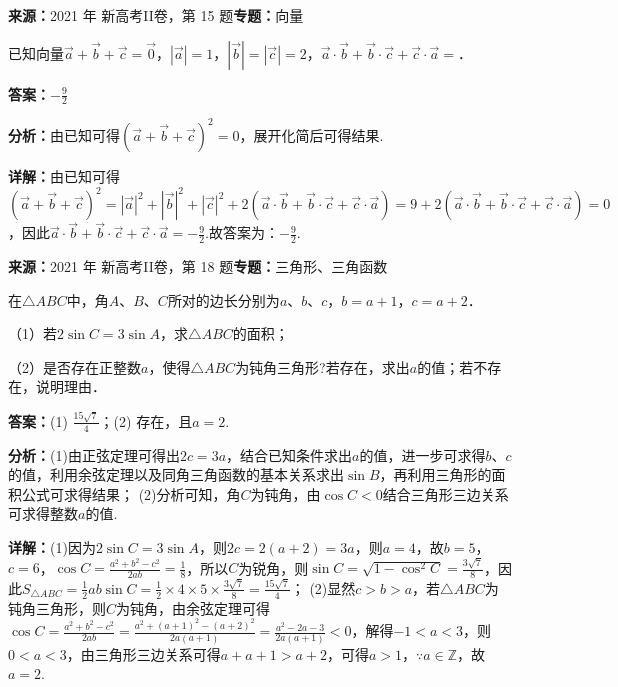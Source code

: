 \begin{question}[points=5]
\textbf{来源：}2021 年 新高考II卷，第 15 题\quad \textbf{专题：}向量\par
已知向量$\vec{a}+\vec{b}+\vec{c}=\vec{0}$，$|\vec{a}|=1$，$|\vec{b}|=|\vec{c}|=2$，$\vec{a}\cdot\vec{b}+\vec{b}\cdot\vec{c}+\vec{c}\cdot\vec{a}=$．
\fillin[{$-\frac{9}{2}$}]
\begin{solution}
\textbf{答案：}$-\frac{9}{2}$

\textbf{分析：}由已知可得$(\vec{a}+\vec{b}+\vec{c})^2=0$，展开化简后可得结果.

\textbf{详解：}由已知可得$(\vec{a}+\vec{b}+\vec{c})^2=|\vec{a}|^2+|\vec{b}|^2+|\vec{c}|^2+2(\vec{a}\cdot\vec{b}+\vec{b}\cdot\vec{c}+\vec{c}\cdot\vec{a})=9+2(\vec{a}\cdot\vec{b}+\vec{b}\cdot\vec{c}+\vec{c}\cdot\vec{a})=0$，因此$\vec{a}\cdot\vec{b}+\vec{b}\cdot\vec{c}+\vec{c}\cdot\vec{a}=-\frac{9}{2}$.故答案为：$-\frac{9}{2}$.
\end{solution}
\end{question}

\begin{question}[points=12]
\textbf{来源：}2021 年 新高考II卷，第 18 题\quad \textbf{专题：}三角形、三角函数\par
在$\triangle ABC$中，角$A$、$B$、$C$所对的边长分别为$a$、$b$、$c$，$b=a+1$，$c=a+2$．

（1）若$2\sin C=3\sin A$，求$\triangle ABC$的面积；

（2）是否存在正整数$a$，使得$\triangle ABC$为钝角三角形?若存在，求出$a$的值；若不存在，说明理由．
\begin{solution}
\textbf{答案：}(1) $\frac{15\sqrt{7}}{4}$；(2) 存在，且$a=2$.

\textbf{分析：}(1)由正弦定理可得出$2c=3a$，结合已知条件求出$a$的值，进一步可求得$b$、$c$的值，利用余弦定理以及同角三角函数的基本关系求出$\sin B$，再利用三角形的面积公式可求得结果； (2)分析可知，角$C$为钝角，由$\cos C<0$结合三角形三边关系可求得整数$a$的值.

\textbf{详解：}(1)因为$2\sin C=3\sin A$，则$2c=2(a+2)=3a$，则$a=4$，故$b=5$，$c=6$，$\cos C=\frac{a^2+b^2-c^2}{2ab}=\frac{1}{8}$，所以$C$为锐角，则$\sin C=\sqrt{1-\cos^2 C}=\frac{3\sqrt{7}}{8}$，因此$S_{\triangle ABC}=\frac{1}{2}ab\sin C=\frac{1}{2}\times4\times5\times\frac{3\sqrt{7}}{8}=\frac{15\sqrt{7}}{4}$； (2)显然$c>b>a$，若$\triangle ABC$为钝角三角形，则$C$为钝角，由余弦定理可得$\cos C=\frac{a^2+b^2-c^2}{2ab}=\frac{a^2+(a+1)^2-(a+2)^2}{2a(a+1)}=\frac{a^2-2a-3}{2a(a+1)}<0$，解得$-1<a<3$，则$0<a<3$，由三角形三边关系可得$a+a+1>a+2$，可得$a>1$，$\because a\in\mathbb{Z}$，故$a=2$.
\end{solution}
\end{question}

